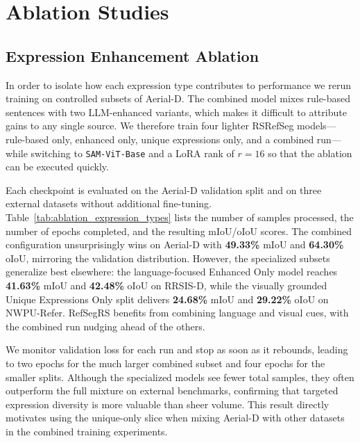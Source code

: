 \section{Ablation Studies}

\subsection{Expression Enhancement Ablation}

In order to isolate how each expression type contributes to performance we rerun training on controlled subsets of Aerial-D. The combined model mixes rule-based sentences with two LLM-enhanced variants, which makes it difficult to attribute gains to any single source. We therefore train four lighter RSRefSeg models—rule-based only, enhanced only, unique expressions only, and a combined run—while switching to \texttt{SAM-ViT-Base} and a LoRA rank of $r=16$ so that the ablation can be executed quickly.

Each checkpoint is evaluated on the Aerial-D validation split and on three external datasets without additional fine-tuning. Table~\ref{tab:ablation_expression_types} lists the number of samples processed, the number of epochs completed, and the resulting mIoU/oIoU scores. The combined configuration unsurprisingly wins on Aerial-D with \textbf{49.33\%} mIoU and \textbf{64.30\%} oIoU, mirroring the validation distribution. However, the specialized subsets generalize best elsewhere: the language-focused Enhanced Only model reaches \textbf{41.63\%} mIoU and \textbf{42.48\%} oIoU on RRSIS-D, while the visually grounded Unique Expressions Only split delivers \textbf{24.68\%} mIoU and \textbf{29.22\%} oIoU on NWPU-Refer. RefSegRS benefits from combining language and visual cues, with the combined run nudging ahead of the others.

We monitor validation loss for each run and stop as soon as it rebounds, leading to two epochs for the much larger combined subset and four epochs for the smaller splits. Although the specialized models see fewer total samples, they often outperform the full mixture on external benchmarks, confirming that targeted expression diversity is more valuable than sheer volume. This result directly motivates using the unique-only slice when mixing Aerial-D with other datasets in the combined training experiments.

